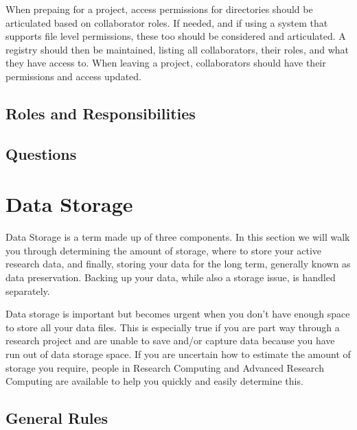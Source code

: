 \documentclass[
]{book}
\begin{document}
When prepaing for a project, access permissions for directories should be articulated based on collaborator roles. If needed, and if using a system that supports file level permissions, these too should be considered and articulated. A registry should then be maintained, listing all collaborators, their roles, and what they have access to. When leaving a project, collaborators should have their permissions and access updated.

\hypertarget{roles-and-responsibilities-4}{%
\section*{Roles and Responsibilities}\label{roles-and-responsibilities-4}}

\hypertarget{questions-6}{%
\section*{Questions}\label{questions-6}}

\hypertarget{data-storage-1}{%
\chapter*{Data Storage}\label{data-storage-1}}

Data Storage is a term made up of three components. In this section we will walk you through determining the amount of storage, where to store your active research data, and finally, storing your data for the long term, generally known as data preservation. Backing up your data, while also a storage issue, is handled separately.

Data storage is important but becomes urgent when you don't have enough space to store all your data files. This is especially true if you are part way through a research project and are unable to save and/or capture data because you have run out of data storage space. If you are uncertain how to estimate the amount of storage you require, people in Research Computing and Advanced Research Computing are available to help you quickly and easily determine this.

\hypertarget{general-rules-4}{%
\section*{General Rules}\label{general-rules-4}}
\end{document}
